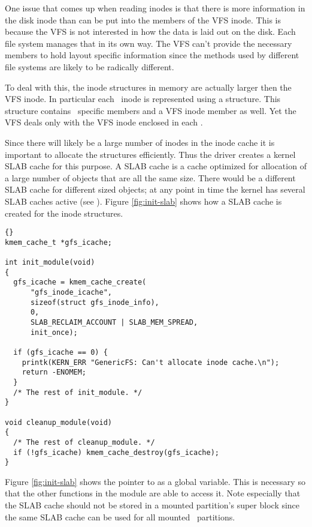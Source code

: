 One issue that comes up when reading inodes is that there is more information in the disk inode
than can be put into the members of the VFS inode. This is because the VFS is not interested in
how the data is laid out on the disk. Each file system manages that in its own way. The VFS
can't provide the necessary members to hold layout specific information since the methods used
by different file systems are likely to be radically different.

To deal with this, the inode structures in memory are actually larger then the VFS inode. In
particular each \GenericFS\ inode is represented using a  structure. This
structure contains \GenericFS\ specific members and a VFS inode member as well. Yet the VFS
deals only with the VFS inode enclosed in each .

Since there will likely be a large number of inodes in the inode cache it is important to
allocate the  structures efficiently. Thus the driver creates a kernel SLAB
cache for this purpose. A SLAB cache is a cache optimized for allocation of a large number of
objects that are all the same size. There would be a different SLAB cache for different sized
objects; at any point in time the kernel has several SLAB caches active (see
). Figure \ref{fig:init-slab} shows how a SLAB cache is created for the
inode structures.

\begin{figure*}[tp]
  \centering
  \begin{wbigbox}
\begin{lstlisting}{}
kmem_cache_t *gfs_icache;

int init_module(void)
{
  gfs_icache = kmem_cache_create(
      "gfs_inode_icache",
      sizeof(struct gfs_inode_info),
      0,
      SLAB_RECLAIM_ACCOUNT | SLAB_MEM_SPREAD,
      init_once);

  if (gfs_icache == 0) {
    printk(KERN_ERR "GenericFS: Can't allocate inode cache.\n");
    return -ENOMEM;
  }
  /* The rest of init_module. */
}

void cleanup_module(void)
{
  /* The rest of cleanup_module. */
  if (!gfs_icache) kmem_cache_destroy(gfs_icache);
}
\end{lstlisting}    
  \end{wbigbox}
  \caption{Initializing and Removing a SLAB Cache}
  \label{fig:init-slab}
\end{figure*}

Figure \ref{fig:init-slab} shows the pointer to  as a global variable. This
is necessary so that the other functions in the module are able to access it. Note especially
that the SLAB cache should not be stored in a mounted partition's super block since the same
SLAB cache can be used for all mounted \GenericFS\ partitions.

